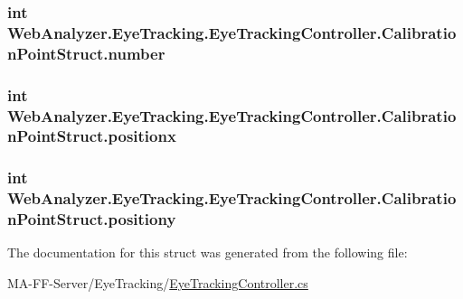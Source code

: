 \subsubsection[{number}]{\setlength{\rightskip}{0pt plus 5cm}int Web\+Analyzer.\+Eye\+Tracking.\+Eye\+Tracking\+Controller.\+Calibration\+Point\+Struct.\+number}\label{struct_web_analyzer_1_1_eye_tracking_1_1_eye_tracking_controller_1_1_calibration_point_struct_a25103a5b9edcc8a34d9e8a50603f42a7}
\hypertarget{struct_web_analyzer_1_1_eye_tracking_1_1_eye_tracking_controller_1_1_calibration_point_struct_a4594f134e46d973b06bb7f89bce6c1d7}{}
\subsubsection[{positionx}]{\setlength{\rightskip}{0pt plus 5cm}int Web\+Analyzer.\+Eye\+Tracking.\+Eye\+Tracking\+Controller.\+Calibration\+Point\+Struct.\+positionx}\label{struct_web_analyzer_1_1_eye_tracking_1_1_eye_tracking_controller_1_1_calibration_point_struct_a4594f134e46d973b06bb7f89bce6c1d7}
\hypertarget{struct_web_analyzer_1_1_eye_tracking_1_1_eye_tracking_controller_1_1_calibration_point_struct_a968184c62ffaaee0a01706b8052635dd}{}
\subsubsection[{positiony}]{\setlength{\rightskip}{0pt plus 5cm}int Web\+Analyzer.\+Eye\+Tracking.\+Eye\+Tracking\+Controller.\+Calibration\+Point\+Struct.\+positiony}\label{struct_web_analyzer_1_1_eye_tracking_1_1_eye_tracking_controller_1_1_calibration_point_struct_a968184c62ffaaee0a01706b8052635dd}


The documentation for this struct was generated from the following file\+:\begin{DoxyCompactItemize}
\item 
M\+A-\/\+F\+F-\/\+Server/\+Eye\+Tracking/\hyperlink{_eye_tracking_controller_8cs}{Eye\+Tracking\+Controller.\+cs}\end{DoxyCompactItemize}
